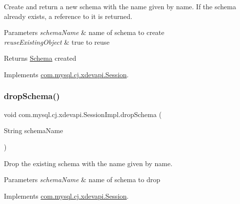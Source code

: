 Create and return a new schema with the name given by name. If the schema already exists, a reference to it is returned.


\begin{DoxyParams}{Parameters}
{\em schema\+Name} & name of schema to create \\
\hline
{\em reuse\+Existing\+Object} & true to reuse \\
\hline
\end{DoxyParams}
\begin{DoxyReturn}{Returns}
\mbox{\hyperlink{interfacecom_1_1mysql_1_1cj_1_1xdevapi_1_1_schema}{Schema}} created 
\end{DoxyReturn}


Implements \mbox{\hyperlink{interfacecom_1_1mysql_1_1cj_1_1xdevapi_1_1_session_aef9311823fd5a36cba753a953f3613d3}{com.\+mysql.\+cj.\+xdevapi.\+Session}}.

\mbox{\label{classcom_1_1mysql_1_1cj_1_1xdevapi_1_1_session_impl_acc48589d267536ca687a05dfb315415c}} 
\subsubsection{\texorpdfstring{drop\+Schema()}{dropSchema()}}
{\footnotesize\ttfamily void com.\+mysql.\+cj.\+xdevapi.\+Session\+Impl.\+drop\+Schema (\begin{DoxyParamCaption}\item[{String}]{schema\+Name }\end{DoxyParamCaption})}

Drop the existing schema with the name given by name.


\begin{DoxyParams}{Parameters}
{\em schema\+Name} & name of schema to drop \\
\hline
\end{DoxyParams}


Implements \mbox{\hyperlink{interfacecom_1_1mysql_1_1cj_1_1xdevapi_1_1_session_af292b70a8b7a6a159e98d36a2729b0e7}{com.\+mysql.\+cj.\+xdevapi.\+Session}}.

\mbox{\label{classcom_1_1mysql_1_1cj_1_1xdevapi_1_1_session_impl_adba641099e94d53a50b08abc745d761b}} 
